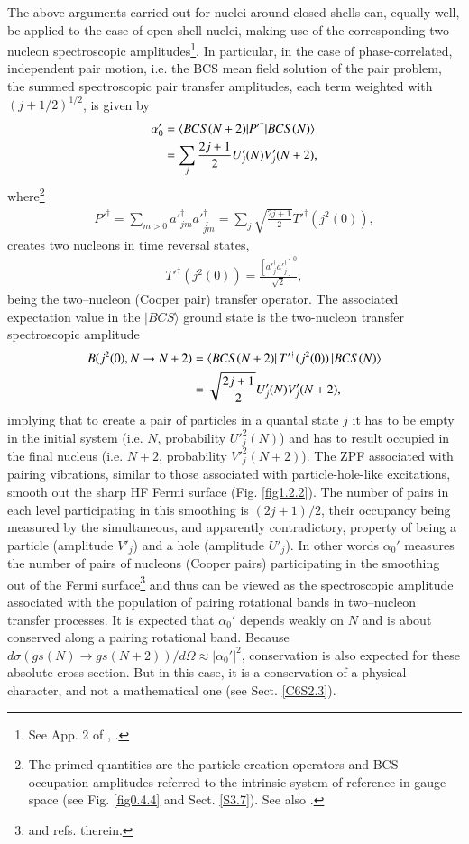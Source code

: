 The above arguments carried out for nuclei around closed shells can,  equally well, be applied to the case of open shell nuclei, making use of the corresponding two-nucleon spectroscopic amplitudes\footnote{See App. 2 of \cite{Broglia:73}, \cite{Yoshida:62}.}.
In particular, in the case of phase-correlated, independent pair motion, i.e. the BCS mean field solution of the pair problem, the summed spectroscopic pair transfer amplitudes, each term weighted with $(j+1/2)^{1/2}$, is given by
\begin{align}\label{eq1.2.14}
\nonumber \alpha_0'&=\langle {BCS(N+2)|P'^\dagger|BCS(N)} \rangle\\
&=\sum_{j}\frac{2j+1}{2}U'_j(N)V'_j(N+2),
\end{align}
where\footnote{The primed quantities are the particle creation operators and BCS occupation amplitudes referred to the intrinsic system of reference in gauge space (see  Fig. \ref{fig0.4.4} and Sect. \ref{S3.7}). See also \cite{Potel:13b}.}
\begin{align}\label{eq1.2.15}
P'^\dagger=\sum_{m>0}a'^\dagger_{jm}a'^\dagger_{\widetilde{jm}}=\sum_j\sqrt{\frac{2j+1}{2}}T'^{\dagger}(j^2(0)),
\end{align}
creates two nucleons in time reversal states, 
\begin{align}\label{eq1.2.16}
T'^{\dagger}(j^2(0))=\frac{\left[a'^\dagger_ja'^\dagger_j\right]^0}{\sqrt{2}},
\end{align}
being the two--nucleon (Cooper pair) transfer operator. The associated expectation value in the $|BCS\rangle$ ground state is the two-nucleon transfer spectroscopic amplitude  
\begin{align}\label{eq1.2.17}
\nonumber B(j^2(0),N\to N+2)&=\langle {BCS(N+2)|\,T'^\dagger(j^2(0))\,|BCS(N)} \rangle\\
&=\sqrt{\frac{2j+1}{2}}U'_j(N)V'_j(N+2),
\end{align}
implying that to create a pair of particles in a quantal state $j$ it has to be empty in the initial system (i.e. $N$, probability $U'^2_j(N)$) and has to result occupied in the final nucleus (i.e. $N+2$, probability $V'^2_j(N+2)$).
The ZPF associated with pairing vibrations, similar to those associated with particle-hole-like excitations,  smooth out the sharp HF Fermi surface (Fig. \ref{fig1.2.2}). The number of pairs in each level participating in this smoothing is $(2j+1)/2$, their occupancy being measured by the simultaneous, and apparently contradictory, property of being a particle (amplitude $V'_j$) and a hole (amplitude $U'_j$). In other words $\alpha_0'$ measures the number of pairs of nucleons (Cooper pairs) participating in the smoothing out of the Fermi surface\footnote{\cite{Schrieffer:64,Potel:17} and refs. therein.} and thus can be viewed as the spectroscopic amplitude associated with the population of pairing rotational bands in two--nucleon transfer processes. It is expected that $\alpha_0'$ depends weakly on $N$ and is about conserved along a pairing rotational band. Because $d\sigma(gs(N)\rightarrow gs(N+2))/d\Omega\approx|\alpha_0'|^2$, conservation is also expected for these absolute cross section. But in this case, it is a conservation of a physical character, and not a mathematical one (see Sect. \ref{C6S2.3}). 


